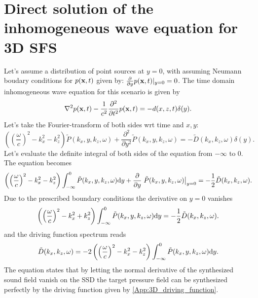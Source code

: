 \section{Direct solution of the inhomogeneous wave equation for 3D SFS}

Let's assume a distribution of point sources at $y = 0$, with assuming Neumann boudary conditions for $p(\mathbf{x},t)$ given by: $\frac{\partial}{\partial y} p(\mathbf{x}, t)|_{y = 0} = 0$. The time domain inhomogeneous wave equation for this scenario is given by
\begin{equation}
\nabla^2 p(\mathbf{x},t) - \frac{1}{c^2}\frac{\partial^2}{\partial t^2} p(\mathbf{x},t) = - d(x,z,t)\delta(y).
\end{equation}
Let's take the Fourier-transform of both sides wrt time and $x,y$:
\begin{equation}
\left( \left( \frac{\omega}{c}  \right)^2 -  k_x^2 - k_z^2 \right) \tilde{P}(k_x,y,k_z,\omega) + \frac{\partial^2}{\partial y^2}  \tilde{P}(k_x,y,k_z,\omega) = - \tilde{D}(k_x,k_z,\omega)\delta(y).
\end{equation}
Let's evaluate the definite integral of both sides of the equation from $-\infty$ to 0. The equation becomes
\begin{equation}
\left( \left( \frac{\omega}{c}  \right)^2 - k_x^2 - k_z^2 \right) \int_{-\infty}^{0} \tilde{P}(k_x,y,k_z,\omega) \mathrm{d} y + \frac{\partial}{\partial y}  \left. \tilde{P}(k_x,y,k_z,\omega)\right|_{y = 0} = -\frac{1}{2}\tilde{D}(k_x,k_z,\omega).
\end{equation}
Due to the prescribed boundary conditions the derivative on $y=0$ vanishes
\begin{equation}
\left( \left( \frac{\omega}{c}  \right)^2 - k_x^2 + k_z^2 \right) \int_{-\infty}^{0} \tilde{P}(k_x,y,k_z,\omega) \mathrm{d} y  = -\frac{1}{2}\tilde{D}(k_x,k_z,\omega).
\end{equation}
and the driving function spectrum reads
\begin{equation}
\tilde{D}(k_x,k_z,\omega)
= -2 \left( \left( \frac{\omega}{c}  \right)^2 - k_x^2 - k_z^2 \right) \int_{-\infty}^{0} \tilde{P}(k_x,y,k_z,\omega) \mathrm{d} y .
\label{App:3D_driving_function_a}
\end{equation}
The equation states that by letting the normal derivative of the synthesized sound field vanish on the SSD the target pressure field can be synthesized perfectly by the driving function given by \eqref{App:3D_driving_function}.

